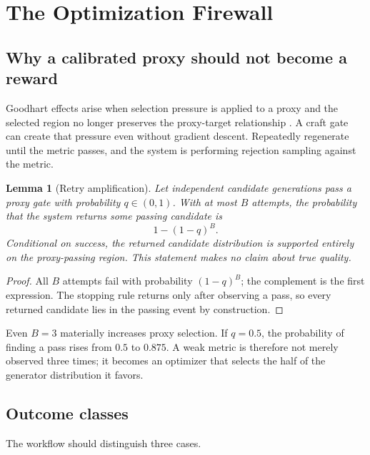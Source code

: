 \documentclass[11pt]{article}
\newtheorem{lemma}[definition]{Lemma}
\begin{document}
\section{The Optimization Firewall}

\subsection{Why a calibrated proxy should not become a reward}

Goodhart effects arise when selection pressure is applied to a proxy and the selected region
no longer preserves the proxy-target relationship \cite{manheim2018goodhart}. A craft gate
can create that pressure even without gradient descent. Repeatedly regenerate until the
metric passes, and the system is performing rejection sampling against the metric.

\begin{lemma}[Retry amplification]
Let independent candidate generations pass a proxy gate with probability $q\in(0,1)$. With
at most $B$ attempts, the probability that the system returns some passing candidate is
\[
 1-(1-q)^B.
\]
Conditional on success, the returned candidate distribution is supported entirely on the
proxy-passing region. This statement makes no claim about true quality.
\end{lemma}

\begin{proof}
All $B$ attempts fail with probability $(1-q)^B$; the complement is the first expression.
The stopping rule returns only after observing a pass, so every returned candidate lies in
the passing event by construction.
\end{proof}

Even $B=3$ materially increases proxy selection. If $q=0.5$, the probability of finding a
pass rises from $0.5$ to $0.875$. A weak metric is therefore not merely observed three times;
it becomes an optimizer that selects the half of the generator distribution it favors.

\subsection{Outcome classes}

The workflow should distinguish three cases.
\end{document}
